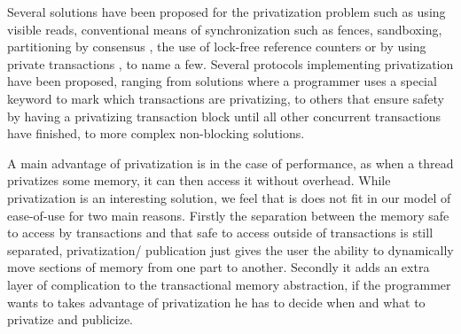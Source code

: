 Several solutions have been proposed for the privatization problem 
such as using visible reads, conventional means of 
synchronization such as fences, sandboxing, partitioning by consensus 
\cite{scott07}, the use of lock-free reference   counters   \cite{afek10}  or   
by  using private transactions \cite{dice10}, to name a few. 
Several protocols implementing privatization have been proposed,
ranging from solutions where a programmer uses a special keyword to mark
which transactions are privatizing, to others that ensure safety by having
a privatizing transaction block until all other concurrent transactions
have finished, to more complex non-blocking solutions.


A main advantage of privatization is in the case of performance, as when
a thread privatizes some memory, it can then access it without overhead.
While privatization is an interesting solution, we feel that is does not
fit in our model of ease-of-use for two main reasons.
Firstly the separation between the memory safe to access by transactions
and that safe to access outside of transactions is still separated, privatization/
publication just gives the user the ability to dynamically move sections of memory
from one part to another.
Secondly it adds an extra layer of complication to the transactional memory
abstraction, if the programmer wants to takes advantage of privatization he
has to decide when and what to privatize and publicize.











